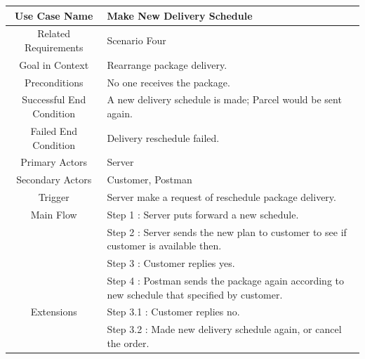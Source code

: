 \documentclass[12pt]{scrreprt}
\begin{document}
\begin{table}
  \centering
  \begin{tabular}{| c | p{11cm} |}
    \hline
    Use Case Name & Make New Delivery Schedule\\
    \hline
    Related Requirements & Scenario Four\\
    \hline
    Goal in Context & Rearrange package delivery.\\
    \hline
    Preconditions & No one receives the package.\\
    \hline
    Successful End Condition & A new delivery schedule is made; Parcel would
    be sent again.\\
    \hline
    Failed End Condition & Delivery reschedule failed.\\
    \hline
    Primary Actors & Server\\
    \hline
    Secondary Actors & Customer, Postman\\
    \hline
    Trigger & Server make a request of reschedule package delivery.\\
    \hline
    Main Flow & Step 1 : Server puts forward a new schedule.\\
    & Step 2 : Server sends the new plan to customer to see if customer is
    available then.\\
    & Step 3 : Customer replies yes.\\
    & Step 4 : Postman sends the package again according to new schedule that
    specified by customer.\\
    \hline
    Extensions & Step 3.1 : Customer replies no.\\
    & Step 3.2 : Made new delivery schedule again, or cancel the order.\\
    \hline
  \end{tabular}
\end{table}
\end{document}
